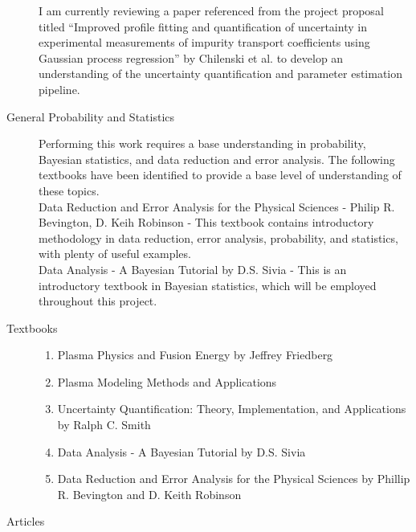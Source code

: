 \documentclass{article}
\begin{document}
\begin{description}
I am currently reviewing a paper referenced from the project proposal titled “Improved profile fitting and quantification of uncertainty in experimental measurements of impurity transport coefficients using Gaussian process regression” by Chilenski et al. to develop an understanding of the uncertainty quantification and parameter estimation pipeline.

\item[General Probability and Statistics]\hfill

Performing this work requires a base understanding in probability, Bayesian statistics, and data reduction and error analysis. The following textbooks have been identified to provide a base level of understanding of these topics.\\
Data Reduction and Error Analysis for the Physical Sciences - Philip R. Bevington,  D. Keih Robinson  - This textbook contains introductory methodology in data reduction, error analysis, probability, and statistics, with plenty of useful examples.\\
Data Analysis - A Bayesian Tutorial by  D.S. Sivia - This is an introductory textbook in Bayesian statistics, which will be employed throughout this project.\\

\item[Textbooks]\hfill
\begin{enumerate}
\item Plasma Physics and Fusion Energy by Jeffrey Friedberg\\
\item Plasma Modeling Methods and Applications\\
\item Uncertainty Quantification: Theory, Implementation, and Applications by Ralph C. Smith\\
\item Data Analysis - A Bayesian Tutorial by  D.S. Sivia\\
\item Data Reduction and Error Analysis for the Physical Sciences by Phillip R. Bevington and D. Keith Robinson\\
\end{enumerate}

\item[Articles] 
\begin{enumerate}
\end{enumerate}
\end{description}

\end{document}
